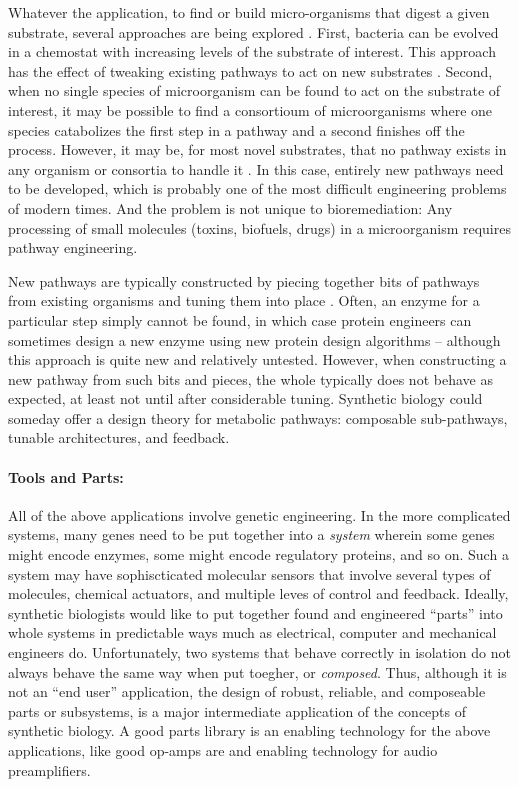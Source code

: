 Whatever the application, to find or build micro-organisms that digest
a given substrate, several approaches are being explored
\cite{bioremediation-overview}. First, bacteria can be evolved in a
chemostat \cite{chemostat} with increasing levels of the substrate of
interest. This approach has the effect of tweaking existing pathways
to act on new substrates \cite{evolve-to-toxin}. Second, when no
single species of microorganism can be found to act on the substrate
of interest, it may be possible to find a consortioum of
microorganisms where one species catabolizes the first step in a
pathway and a second finishes off the process. However, it may be, for
most novel substrates, that no pathway exists in any organism or
consortia to handle it \cite{microbial-consortium}. In this case,
entirely new pathways need to be developed, which is probably one of
the most difficult engineering problems of modern times. And the
problem is not unique to bioremediation: Any processing of
small molecules (toxins, biofuels, drugs) in a microorganism requires
pathway engineering.

New pathways are typically constructed by piecing together bits of
pathways from existing organisms and tuning them into place
\cite{pathway-engineering,metabolic-control-analysis}. Often, an
enzyme for a particular step simply cannot be found, in which case
protein engineers can sometimes design a new enzyme using new protein
design algorithms \cite{baker-de-novo08} -- although this approach is
quite new and relatively untested. However, when constructing a new
pathway from such bits and pieces, the whole typically does not behave
as expected, at least not until after considerable tuning. Synthetic
biology could someday offer a design theory for metabolic pathways:
composable sub-pathways, tunable architectures, and feedback.

\paragraph{Tools and Parts:} All of the above applications involve
genetic engineering. In the more complicated systems, many genes need
to be put together into a {\em system} wherein some genes might encode
enzymes, some might encode regulatory proteins, and so on. Such a
system may have sophiscticated molecular sensors that involve several
types of molecules, chemical actuators, and multiple leves of control
and feedback. Ideally, synthetic biologists would like to put together
found and engineered ``parts'' into whole systems in predictable ways
much as electrical, computer and mechanical engineers
do. Unfortunately, two systems that behave correctly in isolation do
not always behave the same way when put toegher, or {\em
  composed}. Thus, although it is not an ``end user'' application, the
design of robust, reliable, and composeable parts or subsystems, is a
major intermediate application of the concepts of synthetic biology. A
good parts library is an enabling technology for the above
applications, like good op-amps are and enabling technology for audio
preamplifiers.

